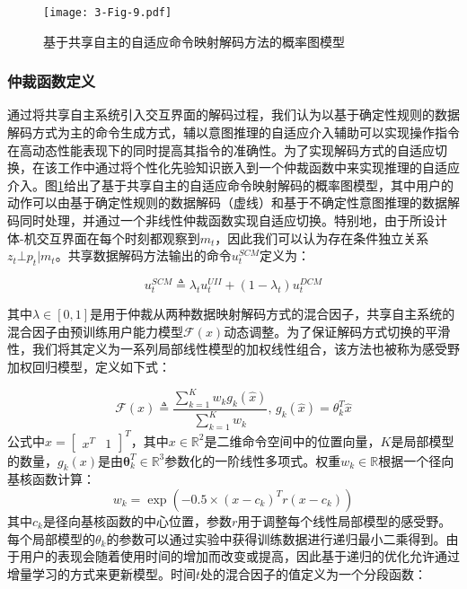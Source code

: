 \begin{figure}[!t]
    \centering
    \texttt{[image: 3-Fig-9.pdf]}
    \caption{基于共享自主的自适应命令映射解码方法的概率图模型}
    \label{3-fig-9}
\end{figure} 

\subsubsection{仲裁函数定义} 
通过将共享自主系统引入交互界面的解码过程，我们认为以基于确定性规则的数据解码方式为主的命令生成方式，辅以意图推理的自适应介入辅助可以实现操作指令在高动态性能表现下的同时提高其指令的准确性。为了实现解码方式的自适应切换，在该工作中通过将个性化先验知识嵌入到一个仲裁函数中来实现推理的自适应介入。图\ref{3-fig-9}给出了基于共享自主的自适应命令映射解码的概率图模型，其中用户的动作可以由基于确定性规则的数据解码（虚线）和基于不确定性意图推理的数据解码同时处理，并通过一个非线性仲裁函数实现自适应切换。特别地，由于所设计体-机交互界面在每个时刻都观察到${m_t}$，因此我们可以认为存在条件独立关系${z_t} \bot {p_t}|{m_t}$。共享数据解码方法输出的命令$u_t^{SCM}$定义为：

\begin{equation}
    \label{ex6}
    u_t^{SCM}\triangleq \lambda_t u_t^{UII}+(1-\lambda_t)u_t^{DCM}
\end{equation}   

其中$\lambda  \in [0,1]$是用于仲裁从两种数据映射解码方式的混合因子，共享自主系统的混合因子由预训练用户能力模型$\mathcal{F}(x)$动态调整。为了保证解码方式切换的平滑性，我们将其定义为一系列局部线性模型的加权线性组合，该方法也被称为感受野加权回归模型\cite{schaalScalableTechniquesNonparametric2002}，定义如下式：

\begin{equation}
    \label{ex7}
    \mathcal{F} (x) \triangleq \frac{{\sum\nolimits_{k = 1}^K {{w_k}{g_k}(\hat x)} }}{{\sum\nolimits_{k = 1}^K {{w_k}} }}{\text{,  }}{g_k}(\hat x) = {\theta}_k^T{\hat x}
\end{equation}   
公式中$\hat x = {[\begin{array}{*{20}{c}}{{x^T}}&1\end{array}]^T}$，其中${x} \in {\mathbb{R}^2}$是二维命令空间中的位置向量，$K$是局部模型的数量，${g_k}(x)$是由${\boldsymbol{\theta }}_k^T \in {\mathbb{R}^{3}}$参数化的一阶线性多项式。权重${w_k\in {\mathbb{R}}}$根据一个径向基核函数计算：
\begin{equation}
    \label{ex8}
    {w_k} = \exp \left( { - 0.5 \times {{(x - {{c}_k})}^T}{{r}}(x - {c_k})} \right)
\end{equation}
其中$c_k$是径向基核函数的中心位置，参数$r$用于调整每个线性局部模型的感受野。每个局部模型的${\theta }_k$的参数可以通过实验中获得训练数据进行递归最小二乘得到。由于用户的表现会随着使用时间的增加而改变或提高，因此基于递归的优化允许通过增量学习的方式来更新模型。时间$t$处的混合因子的值定义为一个分段函数：

